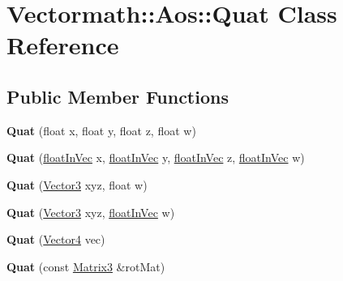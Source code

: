 \hypertarget{classVectormath_1_1Aos_1_1Quat}{\section{Vectormath\-:\-:Aos\-:\-:Quat Class Reference}
\label{classVectormath_1_1Aos_1_1Quat}
}
\subsection*{Public Member Functions}
\begin{DoxyCompactItemize}
\item 
\hypertarget{classVectormath_1_1Aos_1_1Quat_a4a18fd2e45d5e8f61ae896dfa423caff}{{\bfseries Quat} (float x, float y, float z, float w)}\label{classVectormath_1_1Aos_1_1Quat_a4a18fd2e45d5e8f61ae896dfa423caff}

\item 
\hypertarget{classVectormath_1_1Aos_1_1Quat_a5c492bb7d57964a90a2d4b4d7e3b8fc9}{{\bfseries Quat} (\hyperlink{classVectormath_1_1floatInVec}{float\-In\-Vec} x, \hyperlink{classVectormath_1_1floatInVec}{float\-In\-Vec} y, \hyperlink{classVectormath_1_1floatInVec}{float\-In\-Vec} z, \hyperlink{classVectormath_1_1floatInVec}{float\-In\-Vec} w)}\label{classVectormath_1_1Aos_1_1Quat_a5c492bb7d57964a90a2d4b4d7e3b8fc9}

\item 
\hypertarget{classVectormath_1_1Aos_1_1Quat_a2922afde562d5b1a3c93121741bd80a9}{{\bfseries Quat} (\hyperlink{classVectormath_1_1Aos_1_1Vector3}{Vector3} xyz, float w)}\label{classVectormath_1_1Aos_1_1Quat_a2922afde562d5b1a3c93121741bd80a9}

\item 
\hypertarget{classVectormath_1_1Aos_1_1Quat_ab920ec08bc5d958967af8de22902902c}{{\bfseries Quat} (\hyperlink{classVectormath_1_1Aos_1_1Vector3}{Vector3} xyz, \hyperlink{classVectormath_1_1floatInVec}{float\-In\-Vec} w)}\label{classVectormath_1_1Aos_1_1Quat_ab920ec08bc5d958967af8de22902902c}

\item 
\hypertarget{classVectormath_1_1Aos_1_1Quat_a246cfa637a13e541c6139744f46020fb}{{\bfseries Quat} (\hyperlink{classVectormath_1_1Aos_1_1Vector4}{Vector4} vec)}\label{classVectormath_1_1Aos_1_1Quat_a246cfa637a13e541c6139744f46020fb}

\item 
\hypertarget{classVectormath_1_1Aos_1_1Quat_a7a69e540338b53d2ca3da9778fbfe1e4}{{\bfseries Quat} (const \hyperlink{classVectormath_1_1Aos_1_1Matrix3}{Matrix3} \&rot\-Mat)}\label{classVectormath_1_1Aos_1_1Quat_a7a69e540338b53d2ca3da9778fbfe1e4}


\end{DoxyCompactItemize}
